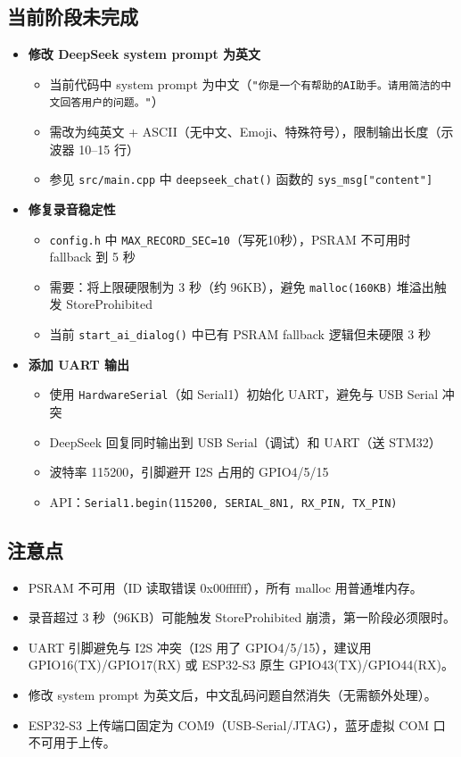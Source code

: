 \documentclass[12pt,a4paper,openany]{ctexbook}
\newcommand{\taskwarn}{{\color{warning}$\blacksquare$}}
\newcommand{\tasktodo}{{\color{graytext}$\blacksquare$}}
\newcommand{\taskfail}{{\color{accent}$\blacksquare$}}
\begin{document}
\subsection*{当前阶段未完成}
\begin{itemize}
    \item[\taskwarn] \textbf{修改 DeepSeek system prompt 为英文}
    \begin{itemize}
        \item 当前代码中 system prompt 为中文（\texttt{"你是一个有帮助的AI助手。请用简洁的中文回答用户的问题。"}）
        \item 需改为纯英文 + ASCII（无中文、Emoji、特殊符号），限制输出长度（示波器 10--15 行）
        \item 参见 \texttt{src/main.cpp} 中 \texttt{deepseek\_chat()} 函数的 \texttt{sys\_msg["content"]}
    \end{itemize}

    \item[\taskfail] \textbf{修复录音稳定性}
    \begin{itemize}
        \item \texttt{config.h} 中 \texttt{MAX\_RECORD\_SEC=10}（写死10秒），PSRAM 不可用时 fallback 到 5 秒
        \item 需要：将上限硬限制为 3 秒（约 96KB），避免 \texttt{malloc(160KB)} 堆溢出触发 StoreProhibited
        \item 当前 \texttt{start\_ai\_dialog()} 中已有 PSRAM fallback 逻辑但未硬限 3 秒
    \end{itemize}

    \item[\tasktodo] \textbf{添加 UART 输出}
    \begin{itemize}
        \item 使用 \texttt{HardwareSerial}（如 Serial1）初始化 UART，避免与 USB Serial 冲突
        \item DeepSeek 回复同时输出到 USB Serial（调试）和 UART（送 STM32）
        \item 波特率 115200，引脚避开 I2S 占用的 GPIO4/5/15
        \item API：\texttt{Serial1.begin(115200, SERIAL\_8N1, RX\_PIN, TX\_PIN)}
    \end{itemize}
\end{itemize}

\subsection*{注意点}
\begin{itemize}
    \item PSRAM 不可用（ID 读取错误 0x00ffffff），所有 malloc 用普通堆内存。
    \item 录音超过 3 秒（96KB）可能触发 StoreProhibited 崩溃，第一阶段必须限时。
    \item UART 引脚避免与 I2S 冲突（I2S 用了 GPIO4/5/15），建议用 GPIO16(TX)/GPIO17(RX) 或 ESP32-S3 原生 GPIO43(TX)/GPIO44(RX)。
    \item 修改 system prompt 为英文后，中文乱码问题自然消失（无需额外处理）。
    \item ESP32-S3 上传端口固定为 COM9（USB-Serial/JTAG），蓝牙虚拟 COM 口不可用于上传。
\end{itemize}
\end{document}
